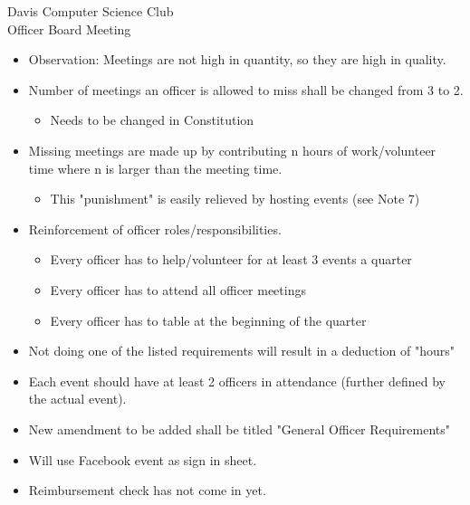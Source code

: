 \documentclass{article}
\begin{document}
\begin{Minutes}{Davis Computer Science Club\\Officer Board Meeting}
\begin{itemize}
    \item Observation: Meetings are not high in quantity, so they are high in quality.
    \item Number of meetings an officer is allowed to miss shall be changed from 3 to 2. 
        \begin{itemize}
            \item Needs to be changed in Constitution
        \end{itemize}
    \item Missing meetings are made up by contributing n hours of work/volunteer time where n is larger than the meeting time.
        \begin{itemize}
            \item This "punishment" is easily relieved by hosting events (see Note 7)
        \end{itemize}
    \item Reinforcement of officer roles/responsibilities.
    \begin{itemize}
        \item Every officer has to help/volunteer for at least 3 events a quarter
        \item Every officer has to attend all officer meetings
        \item Every officer has to table at the beginning of the quarter
    \end{itemize}
    \item Not doing one of the listed requirements will result in a deduction of "hours"
    \item Each event should have at least 2 officers in attendance (further defined by the actual event). 
    \item New amendment to be added shall be titled "General Officer Requirements"
\end{itemize}

\begin{itemize}
    \item Will use Facebook event as sign in sheet.
    \item Reimbursement check has not come in yet.
\end{itemize}


\begin{itemize}
    

\end{itemize}
\end{Minutes}
\end{document}

